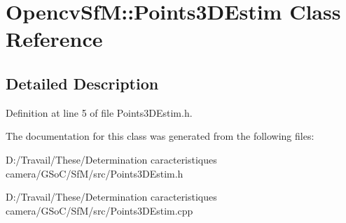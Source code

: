 \hypertarget{class_opencv_sf_m_1_1_points3_d_estim}{
\section{OpencvSfM::Points3DEstim Class Reference}
\label{class_opencv_sf_m_1_1_points3_d_estim}
}


\subsection{Detailed Description}


Definition at line 5 of file Points3DEstim.h.



The documentation for this class was generated from the following files:\begin{DoxyCompactItemize}
\item 
D:/Travail/These/Determination caracteristiques camera/GSoC/SfM/src/Points3DEstim.h\item 
D:/Travail/These/Determination caracteristiques camera/GSoC/SfM/src/Points3DEstim.cpp\end{DoxyCompactItemize}
